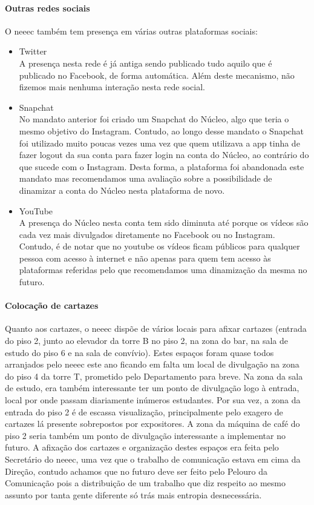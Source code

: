 \paragraph{Outras redes sociais}
O \acrshort{neeec} também tem presença em várias outras plataformas sociais:
\begin{itemize}
\item Twitter\\
A presença nesta rede é já antiga sendo publicado tudo aquilo que é publicado no Facebook, de forma automática. Além deste mecanismo, não fizemos mais nenhuma interação nesta rede social.
\item Snapchat\\
No mandato anterior foi criado um Snapchat do Núcleo, algo que teria o mesmo objetivo do Instagram. Contudo, ao longo desse mandato o Snapchat foi utilizado muito poucas vezes uma vez que quem utilizava a app tinha de fazer logout da sua conta para fazer login na conta do Núcleo, ao contrário do que sucede com o Instagram. Desta forma, a plataforma foi abandonada este mandato mas recomendamos uma avaliação sobre a possibilidade de dinamizar a conta do Núcleo nesta plataforma de novo.
\item YouTube\\
A presença do Núcleo nesta conta tem sido diminuta até porque os vídeos são cada vez mais divulgados diretamente no Facebook ou no Instagram. Contudo, é de notar que no youtube os vídeos ficam públicos para qualquer pessoa com acesso à internet e não apenas para quem tem acesso às plataformas referidas pelo que recomendamos uma dinamização da mesma no futuro.
\end{itemize}

\paragraph{Colocação de cartazes}
Quanto aos cartazes, o \acrshort{neeec} dispõe de vários locais para afixar cartazes (entrada do piso 2, junto ao elevador da torre B no piso 2, na zona do bar, na sala de estudo do piso 6 e na sala de convívio). Estes espaços foram quase todos arranjados pelo \acrshort{neeec} este ano ficando em falta um local de divulgação na zona do piso 4 da torre T, prometido pelo Departamento para breve. Na zona da sala de estudo, era também interessante ter um ponto de divulgação logo à entrada, local por onde passam diariamente inúmeros estudantes. Por sua vez, a zona da entrada do piso 2 é de escassa visualização, principalmente pelo exagero de cartazes lá presente sobrepostos por expositores. A zona da máquina de café do piso 2 seria também um ponto de divulgação interessante a implementar no futuro. A afixação dos cartazes e organização destes espaços era feita pelo Secretário do \acrshort{neeec}, uma vez que o trabalho de comunicação estava em cima da Direção, contudo achamos que no futuro deve ser feito pelo Pelouro da Comunicação pois a distribuição de um trabalho que diz respeito ao mesmo assunto por tanta gente diferente só trás mais entropia desnecessária.

